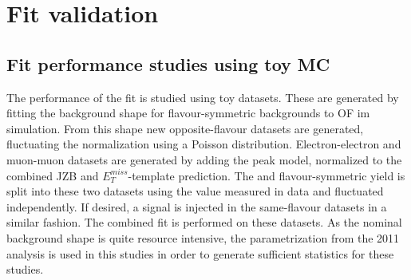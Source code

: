 \section{Fit validation}

\subsection{Fit performance studies using toy MC}
\label{sec:toys}
The performance of the fit is studied using toy datasets. These are generated by fitting the background shape for flavour-symmetric backgrounds to OF im simulation. From this shape new opposite-flavour datasets are generated, fluctuating the normalization using a Poisson distribution. Electron-electron and muon-muon datasets are generated by adding the \Z peak model, normalized to the combined JZB and $E_T^{miss}$-template prediction. The \Z and flavour-symmetric yield is split into these two datasets using the \rmue value measured in data and fluctuated independently. If desired, a signal is injected in the same-flavour datasets in a similar fashion. The combined fit is performed on these datasets. As the nominal background shape is quite resource intensive, the parametrization from the 2011 analysis is used in this studies in order to generate sufficient statistics for these studies. 
